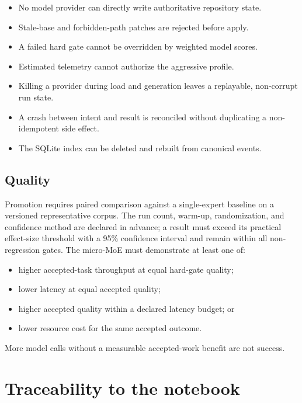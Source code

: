 \documentclass[11pt,letterpaper]{article}
\begin{document}
\begin{itemize}
  \item No model provider can directly write authoritative repository state.
  \item Stale-base and forbidden-path patches are rejected before apply.
  \item A failed hard gate cannot be overridden by weighted model scores.
  \item Estimated telemetry cannot authorize the aggressive profile.
  \item Killing a provider during load and generation leaves a replayable,
        non-corrupt run state.
  \item A crash between intent and result is reconciled without duplicating a
        non-idempotent side effect.
  \item The SQLite index can be deleted and rebuilt from canonical events.
\end{itemize}

\subsection{Quality}

Promotion requires paired comparison against a single-expert baseline on a
versioned representative corpus. The run count, warm-up, randomization, and
confidence method are declared in advance; a result must exceed its practical
effect-size threshold with a 95\% confidence interval and remain within all
non-regression gates. The micro-MoE must demonstrate at least one of:

\begin{itemize}
  \item higher accepted-task throughput at equal hard-gate quality;
  \item lower latency at equal accepted quality;
  \item higher accepted quality within a declared latency budget; or
  \item lower resource cost for the same accepted outcome.
\end{itemize}

More model calls without a measurable accepted-work benefit are not success.

\section{Traceability to the notebook}
\end{document}
